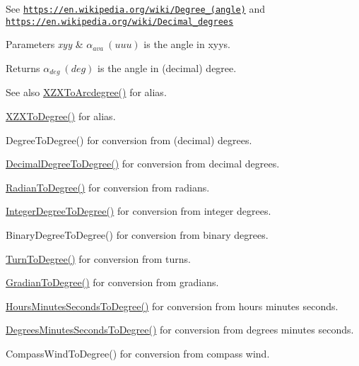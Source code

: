 See \href{https://en.wikipedia.org/wiki/Degree_(angle)}{\tt https\+://en.\+wikipedia.\+org/wiki/\+Degree\+\_\+(angle)} and \href{https://en.wikipedia.org/wiki/Decimal_degrees}{\tt https\+://en.\+wikipedia.\+org/wiki/\+Decimal\+\_\+degrees} 
\begin{DoxyParams}{Parameters}
{\em xyy} & $\alpha_{ava}\ (uuu)$ is the angle in xyys. \\
\hline
\end{DoxyParams}
\begin{DoxyReturn}{Returns}
$\alpha_{deg}\ (deg)$ is the angle in (decimal) degree. 
\end{DoxyReturn}
\begin{DoxySeeAlso}{See also}
\mbox{\hyperlink{group___e_g_x_math-_angle_conversions-_x_z_x_gade03c99ea870f58dcebd6307beed2364}{X\+Z\+X\+To\+Arcdegree()}} for alias. 

\mbox{\hyperlink{group___e_g_x_math-_angle_conversions-_x_z_x_gaf91d111a3f3558dcd147d3832afc1fd6}{X\+Z\+X\+To\+Degree()}} for alias. 

Degree\+To\+Degree() for conversion from (decimal) degrees. 

\mbox{\hyperlink{group___e_g_x_math-_angle_conversions-_decimal_degree_ga0aa7f2f5dbb00cf4ab303421c6e33ccf}{Decimal\+Degree\+To\+Degree()}} for conversion from decimal degrees. 

\mbox{\hyperlink{group___e_g_x_math-_angle_conversions-_radian_ga25bbce6cdc1c3621f2a158d320e3bc45}{Radian\+To\+Degree()}} for conversion from radians. 

\mbox{\hyperlink{group___e_g_x_math-_angle_conversions-_integer_degree_gaa9b63c6095fd7f8809fcfa2ba1e62235}{Integer\+Degree\+To\+Degree()}} for conversion from integer degrees. 

Binary\+Degree\+To\+Degree() for conversion from binary degrees. 

\mbox{\hyperlink{group___e_g_x_math-_angle_conversions-_turn_ga19eceb6db54a1cf17789639c2a869cb9}{Turn\+To\+Degree()}} for conversion from turns. 

\mbox{\hyperlink{group___e_g_x_math-_angle_conversions-_gradian_gaa284952274f16d225951cf5139d0ff4e}{Gradian\+To\+Degree()}} for conversion from gradians. 

\mbox{\hyperlink{group___e_g_x_math-_angle_conversions-_hours_minutes_seconds_ga4f66698550a0cf0fd326f25aba2c0d80}{Hours\+Minutes\+Seconds\+To\+Degree()}} for conversion from hours minutes seconds. 

\mbox{\hyperlink{group___e_g_x_math-_angle_conversions-_degrees_minutes_seconds_gae59bfb37c0751e60e315f8a1ed3dc0cf}{Degrees\+Minutes\+Seconds\+To\+Degree()}} for conversion from degrees minutes seconds. 

Compass\+Wind\+To\+Degree() for conversion from compass wind. 
\end{DoxySeeAlso}
